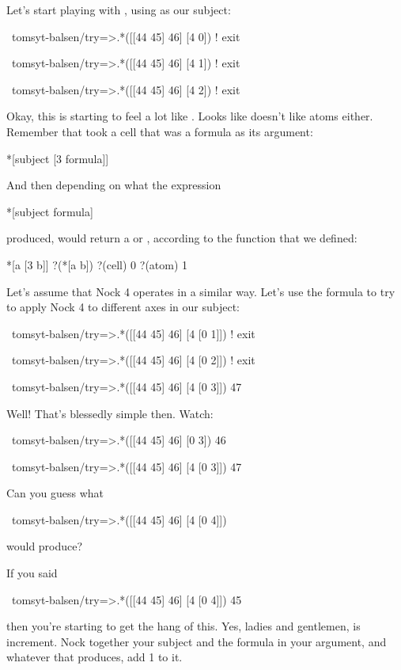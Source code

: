 Let's start playing with , using \kode{[[44 45] 46]} as our subject:
\begin{code}
~tomsyt-balsen/try=>.*([[44 45] 46] [4 0])
! exit

~tomsyt-balsen/try=>.*([[44 45] 46] [4 1])
! exit

~tomsyt-balsen/try=>.*([[44 45] 46] [4 2])
! exit
\end{code}
Okay, this is starting to feel a lot like . Looks like  doesn't
like atoms either. Remember that  took a cell that was a formula as its
argument:
\begin{code}
*[subject [3 formula]]
\end{code}
And then depending on what the expression
\begin{code}
*[subject formula]
\end{code}
produced,  would return a  or , according to the function 
that we defined:
\begin{code}
*[a [3 b]]         ?(*[a b])
?(cell)            0
?(atom)            1
\end{code}
Let's assume that Nock 4 operates in a similar way. Let's use the formula \kode{[0
n]} to try to apply Nock 4 to different axes in our subject:

\begin{code}
~tomsyt-balsen/try=>.*([[44 45] 46] [4 [0 1]])
! exit

~tomsyt-balsen/try=>.*([[44 45] 46] [4 [0 2]])
! exit

~tomsyt-balsen/try=>.*([[44 45] 46] [4 [0 3]])
47
\end{code}
Well! That's blessedly simple then. Watch:
\begin{code}
~tomsyt-balsen/try=>.*([[44 45] 46] [0 3])
46

~tomsyt-balsen/try=>.*([[44 45] 46] [4 [0 3]])
47
\end{code}
Can you guess what 
\begin{code}
~tomsyt-balsen/try=>.*([[44 45] 46] [4 [0 4]])
\end{code}
would produce?

If you said 
\begin{code}
~tomsyt-balsen/try=>.*([[44 45] 46] [4 [0 4]])
45
\end{code}
then you're starting to get the hang of this. Yes, ladies and gentlemen,  is increment. Nock together your subject and the formula in your argument,
and whatever that produces, add 1 to it.

